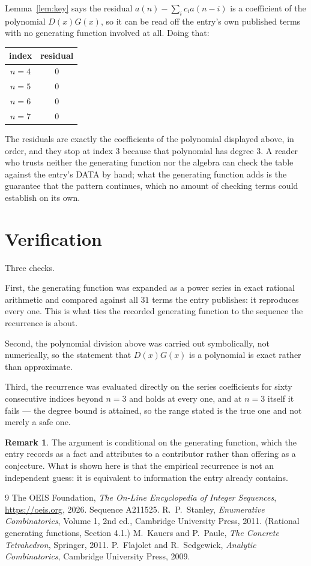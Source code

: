 \documentclass[11pt,a4paper]{article}
\theoremstyle{plain}
\theoremstyle{definition}
\newtheorem{remark}[theorem]{Remark}
\begin{document}
Lemma~\ref{lem:key} says the residual $a(n)-\sum_ic_ia(n-i)$ is a coefficient of the
polynomial $D(x)G(x)$, so it can be read off the entry's own published terms with no
generating function involved at all. Doing that:
\begin{center}
\begin{tabular}{cc}
index & residual \\ \hline
$n=4$ & $0$ \\
$n=5$ & $0$ \\
$n=6$ & $0$ \\
$n=7$ & $0$
\end{tabular}
\end{center}
The residuals are exactly the coefficients of the polynomial displayed above, in order, and
they stop at index $3$ because that polynomial has degree $3$. A reader who trusts
neither the generating function nor the algebra can check the table against the entry's DATA
by hand; what the generating function adds is the guarantee that the pattern continues, which
no amount of checking terms could establish on its own.

\section{Verification}

Three checks.

First, the generating function was expanded as a power series in exact rational arithmetic and
compared against all $31$ terms the entry publishes: it reproduces every one. This is
what ties the recorded generating function to the sequence the recurrence is about.

Second, the polynomial division above was carried out symbolically, not numerically, so the
statement that $D(x)G(x)$ is a polynomial is exact rather than approximate.

Third, the recurrence was evaluated directly on the series coefficients for sixty consecutive
indices beyond $n=3$ and holds at every one, and at $n=3$ itself it fails --- the
degree bound is attained, so the range stated is the true one and not merely a safe one.

\begin{remark}
The argument is conditional on the generating function, which the entry records as a fact and
attributes to a contributor rather than offering as a conjecture. What is shown here is that
the empirical recurrence is not an independent guess: it is equivalent to information the
entry already contains.
\end{remark}

\begin{thebibliography}{9}
 The OEIS Foundation, \emph{The On-Line Encyclopedia of Integer
Sequences}, \url{https://oeis.org}, 2026. Sequence A211525.
 R.~P.~Stanley, \emph{Enumerative Combinatorics}, Volume 1, 2nd ed.,
Cambridge University Press, 2011. (Rational generating functions, Section 4.1.)
 M.~Kauers and P.~Paule, \emph{The Concrete Tetrahedron}, Springer, 2011.
 P.~Flajolet and R.~Sedgewick, \emph{Analytic Combinatorics}, Cambridge
University Press, 2009.
\end{thebibliography}
\end{document}

